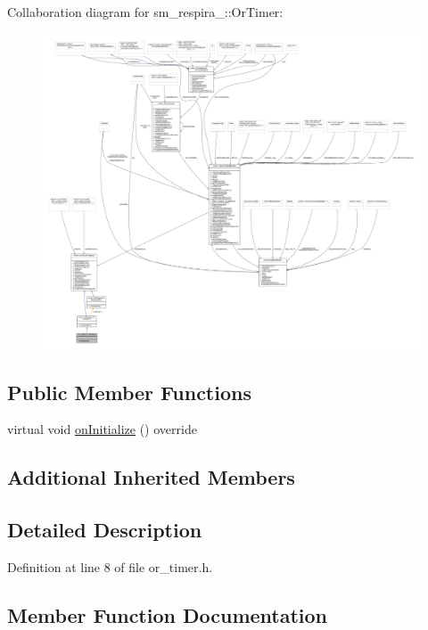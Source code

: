 Collaboration diagram for sm\+\_\+respira\+\_\+:\+:Or\+Timer\+:
\nopagebreak
\begin{figure}[H]
\begin{center}
\leavevmode
\includegraphics[width=350pt]{classsm__respira__1_1_1OrTimer__coll__graph}
\end{center}
\end{figure}
\subsection*{Public Member Functions}
\begin{DoxyCompactItemize}
\item 
virtual void \hyperlink{classsm__respira__1_1_1OrTimer_a56ebeb47c3cb724d6bb586847766c6c7}{on\+Initialize} () override
\end{DoxyCompactItemize}
\subsection*{Additional Inherited Members}


\subsection{Detailed Description}


Definition at line 8 of file or\+\_\+timer.\+h.



\subsection{Member Function Documentation}
